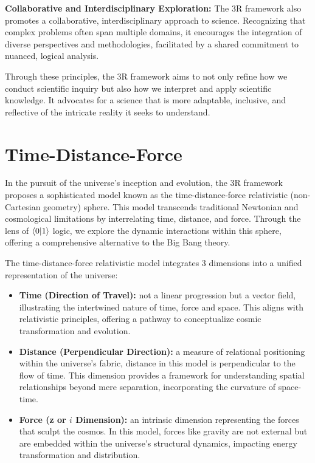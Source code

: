 \documentclass[12pt]{article}
\begin{document}
\textbf{Collaborative and Interdisciplinary Exploration:} The 3R framework also promotes a collaborative, interdisciplinary approach to science. Recognizing that complex problems often span multiple domains, it encourages the integration of diverse perspectives and methodologies, facilitated by a shared commitment to nuanced, logical analysis.

Through these principles, the 3R framework aims to not only refine how we conduct scientific inquiry but also how we interpret and apply scientific knowledge. It advocates for a science that is more adaptable, inclusive, and reflective of the intricate reality it seeks to understand.

\section*{Time-Distance-Force}

In the pursuit of the universe's inception and evolution, the 3R framework proposes a sophisticated model known as the time-distance-force relativistic (non-Cartesian geometry) sphere. This model transcends traditional Newtonian and cosmological limitations by interrelating time, distance, and force. Through the lens of \(\langle 0 | 1 \rangle\) logic, we explore the dynamic interactions within this sphere, offering a comprehensive alternative to the Big Bang theory.

The time-distance-force relativistic model integrates 3 dimensions into a unified representation of the universe:

\begin{itemize}
    \item \textbf{Time (Direction of Travel):} not a linear progression but a vector field, illustrating the intertwined nature of time, force and space. This aligns with relativistic principles, offering a pathway to conceptualize cosmic transformation and evolution.
    \item \textbf{Distance (Perpendicular Direction):} a measure of relational positioning within the universe's fabric, distance in this model is perpendicular to the flow of time. This dimension provides a framework for understanding spatial relationships beyond mere separation, incorporating the curvature of space-time.
    \item \textbf{Force (z or \(i\) Dimension):} an intrinsic dimension representing the forces that sculpt the cosmos. In this model, forces like gravity are not external but are embedded within the universe's structural dynamics, impacting energy transformation and distribution.
\end{itemize}
\end{document}
